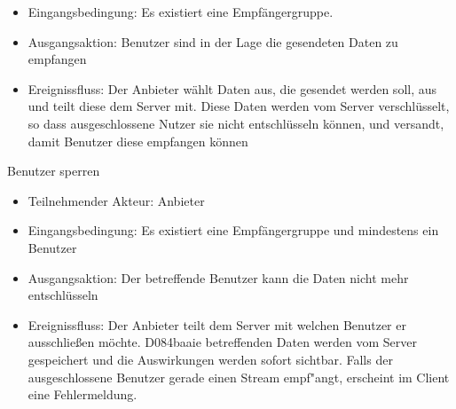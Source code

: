 \documentclass[a4paper,10pt]{scrartcl}
\begin{document}
\begin{usecase}
{\begin{itemize}
   \item Eingangsbedingung: Es existiert eine Empfängergruppe.
   \item Ausgangsaktion: Benutzer sind in der Lage die gesendeten Daten zu empfangen
   \item Ereignissfluss: Der Anbieter wählt Daten aus, die gesendet werden soll, aus und
         teilt diese dem Server mit. Diese Daten werden vom Server verschlüsselt, so 
         dass ausgeschlossene Nutzer sie nicht entschlüsseln können, und versandt, damit
         Benutzer diese empfangen können
   \end{itemize}
}
 {Benutzer sperren
   \begin{itemize}
   \item Teilnehmender Akteur: Anbieter
   \item Eingangsbedingung: Es existiert eine Empfängergruppe und mindestens ein Benutzer
   \item Ausgangsaktion: Der betreffende Benutzer kann die Daten nicht mehr entschlüsseln
   \item Ereignissfluss: Der Anbieter teilt dem Server mit welchen Benutzer er ausschließen möchte.
         D084baaie betreffenden Daten werden vom Server gespeichert und die Auswirkungen werden
         sofort sichtbar. Falls der ausgeschlossene Benutzer gerade einen Stream empf"angt,
         erscheint im Client eine Fehlermeldung.
   \end{itemize}
}
\end{usecase}
\clearpage
\end{document}
